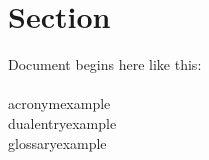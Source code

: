 \documentclass[../main.tex]{subfiles}
\begin{document}
	\section{Section}
		Document begins here like this:       \\
		\cite[Bibtex2021]{cite 1}\\
		\gls{acronymexample}\\
		\gls{dualentryexample}\\
		\gls{glossaryexample}\\
		
\end{document}
